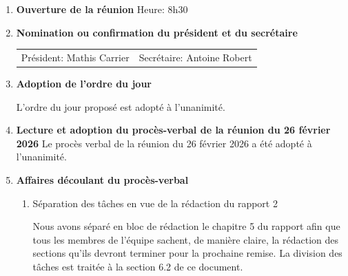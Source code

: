 \documentclass[12pt]{ULojpv}
\begin{document}
\entete
\begin{enumerate}

\item \textbf{Ouverture de la réunion}
Heure: 8h30

\item \textbf{Nomination ou confirmation du président et du secrétaire}

\begin{tabular}{@{}ll}
   Président: Mathis Carrier
   & Secrétaire: Antoine Robert
\end{tabular}

\item \textbf{Adoption de l'ordre du jour}

L'ordre du jour proposé est adopté à l'unanimité.

\item \textbf{Lecture et adoption du procès-verbal de la réunion du 26 février 2026}
Le procès verbal de la réunion du 26 février 2026 a été adopté à l'unanimité.

\item \textbf{Affaires découlant du procès-verbal}
\begin{enumerate}
   \item Séparation des tâches en vue de la rédaction du rapport 2

   Nous avons séparé en bloc de rédaction le chapitre 5 du rapport afin que tous les membres de l'équipe sachent, de manière claire, la rédaction des sections qu'ils devront terminer pour la prochaine remise. La division des tâches est traitée à la section 6.2 de ce document.

\end{enumerate}

\end{enumerate}
\end{document}
